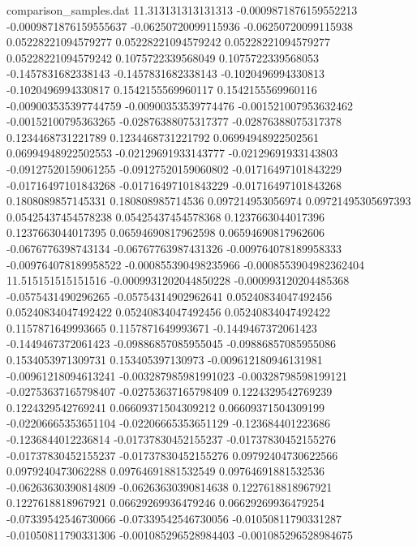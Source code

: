 \begin{filecontents}{comparison_samples.dat}
11.313131313131313  -0.0009871876159552213  -0.0009871876159555637  -0.06250720099115936   -0.06250720099115938   0.05228221094579277    0.05228221094579242    0.05228221094579277    0.05228221094579242    0.1075722339568049     0.1075722339568053     -0.1457831682338143     -0.1457831682338143     -0.1020496994330813    -0.1020496994330817    0.1542155569960117      0.1542155569960116      -0.009003535397744759   -0.00900353539774476    -0.001521007953632462   -0.00152100795363265    -0.02876388075317377    -0.02876388075317378    0.1234468731221789      0.1234468731221792      0.06994948922502561     0.06994948922502553     -0.02129691933143777   -0.02129691933143803   -0.09127520159061255   -0.09127520159060802   -0.01716497101843229    -0.01716497101843268    -0.01716497101843229    -0.01716497101843268    0.1808089857145331     0.180808985714536      0.097214953056974       0.09721495305697393     0.05425437454578238    0.05425437454578368    0.1237663044017396      0.1237663044017395      0.06594690817962598     0.06594690817962606     -0.0676776398743134    -0.06767763987431326   -0.009764078189958333  -0.009764078189958522  -0.000855390498235966   -0.0008553904982362404
11.515151515151516  -0.0009931202044850228  -0.000993120204485368   -0.0575431490296265    -0.05754314902962641   0.05240834047492456    0.05240834047492422    0.05240834047492456    0.05240834047492422    0.1157871649993665     0.1157871649993671     -0.1449467372061423     -0.1449467372061423     -0.09886857085955045   -0.09886857085955086   0.1534053971309731      0.153405397130973       -0.009612180946131981   -0.00961218094613241    -0.003287985981991023   -0.00328798598199121    -0.02753637165798407    -0.02753637165798409    0.1224329542769239      0.1224329542769241      0.06609371504309212     0.06609371504309199     -0.02206665353651104   -0.02206665353651129   -0.123684401223686     -0.1236844012236814    -0.01737830452155237    -0.01737830452155276    -0.01737830452155237    -0.01737830452155276    0.09792404730622566    0.0979240473062288     0.09764691881532549     0.09764691881532536     -0.06263630390814809   -0.06263630390814638   0.1227618818967921      0.1227618818967921      0.06629269936479246     0.06629269936479254     -0.07339542546730066   -0.07339542546730056   -0.01050811790331287   -0.01050811790331306   -0.001085296528984403   -0.001085296528984675 

\end{filecontents}
